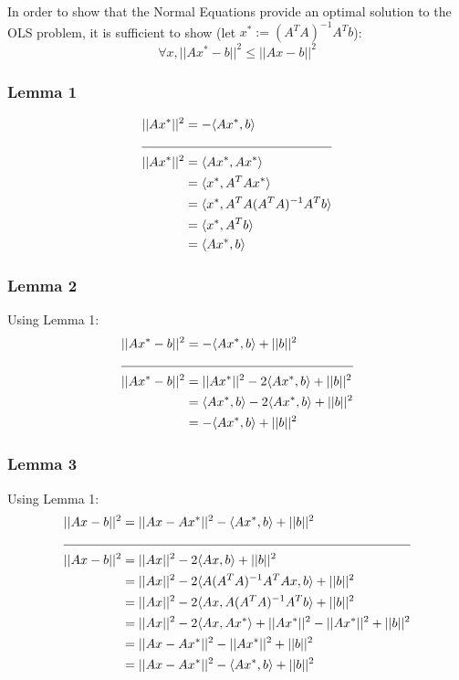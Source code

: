 \documentclass[12pt]{article}
\begin{document}
In order to show that the Normal Equations provide an optimal solution to the OLS problem, it is sufficient to show (let $x^* := (A^T A)^{-1} A^T b$):
$$\forall x, ||Ax^* - b||^2 \le ||Ax - b||^2$$

\subsubsection{Lemma 1}
\begin{align*}
||Ax^*||^2 &= -\langle Ax^*, b \rangle \\
\cline{1 - 2}
||Ax^*||^2 &= \langle Ax^*, Ax^* \rangle \\
 &= \langle x^*, A^T Ax^* \rangle \\
 &= \langle x^*, A^T A (A^T A)^{-1} A^T b \rangle \\
 &= \langle x^*, A^T b \rangle \\
 &= \langle Ax^*, b \rangle
\end{align*}

\subsubsection{Lemma 2}
Using Lemma 1:
\begin{align*}
||Ax^* - b||^2 &= -\langle Ax^*, b \rangle + ||b||^2 \\
\cline{1 - 2}
||Ax^* - b||^2 &= ||Ax^*||^2 - 2 \langle Ax^*, b \rangle + ||b||^2 \\
 &= \langle Ax^*, b \rangle - 2 \langle Ax^*, b \rangle + ||b||^2 \\
 &= -\langle Ax^*, b \rangle + ||b||^2
\end{align*}

\subsubsection{Lemma 3}
Using Lemma 1:
\begin{align*}
||Ax - b||^2 &= ||Ax - Ax^*||^2 - \langle Ax^*, b \rangle + ||b||^2 \\
\cline{1 - 2}
||Ax - b||^2 &= ||Ax||^2 - 2 \langle Ax, b \rangle + ||b||^2 \\
 &= ||Ax||^2 - 2 \langle A (A^T A)^{-1} A^T A x, b \rangle + ||b||^2 \\
 &= ||Ax||^2 - 2 \langle Ax, A (A^T A)^{-1} A^T b \rangle + ||b||^2 \\
 &= ||Ax||^2 - 2 \langle Ax, Ax^* \rangle + ||Ax^*||^2 - ||Ax^*||^2 + ||b||^2 \\
 &= ||Ax - Ax^*||^2 - ||Ax^*||^2 + ||b||^2 \\
 &= ||Ax - Ax^*||^2 - \langle Ax^*, b \rangle + ||b||^2
\end{align*}
\end{document}
